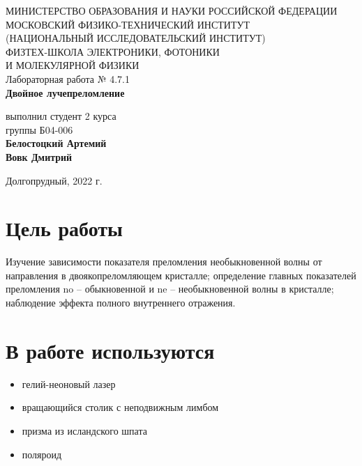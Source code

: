 \documentclass[a4paper,12pt]{article}
\begin{document}
 

\begin{titlepage}
	\begin{center}
		\large 	МИНИСТЕРСТВО ОБРАЗОВАНИЯ И НАУКИ РОССИЙСКОЙ ФЕДЕРАЦИИ\\
				МОСКОВСКИЙ ФИЗИКО-ТЕХНИЧЕСКИЙ ИНСТИТУТ \\
				(НАЦИОНАЛЬНЫЙ ИССЛЕДОВАТЕЛЬСКИЙ ИНСТИТУТ)\\ 
				ФИЗТЕХ-ШКОЛА ЭЛЕКТРОНИКИ, ФОТОНИКИ \\
				И МОЛЕКУЛЯРНОЙ ФИЗИКИ \\
		
		
		\vspace{4.0 cm}
		Лабораторная работа № 4.7.1 \\ 
		\LARGE \textbf{Двойное лучепреломление}
	\end{center}
	\vspace{3 cm} \large
	
	\begin{flushright}
		выполнил студент 2 курса \\
		{группы Б04-006}\\
		\textbf{Белостоцкий Артемий}\\
		\textbf{Вовк Дмитрий}\\
	\end{flushright}
	
	\vfill

	\begin{center}
	Долгопрудный, 2022 г.
	\end{center}
\end{titlepage}                                                                      


\section*{Цель работы}

Изучение зависимости показателя преломления необыкновенной волны от направления в двоякопреломляющем кристалле; определение главных показателей преломления no -- обыкновенной и ne -- необыкновенной волны в кристалле; наблюдение эффекта полного внутреннего отражения.

\section*{В работе используются}
\begin{itemize}
\item гелий-неоновый лазер
\item вращающийся столик с неподвижным лимбом
\item призма из исландского шпата
\item поляроид
\end{itemize}
\end{document}
